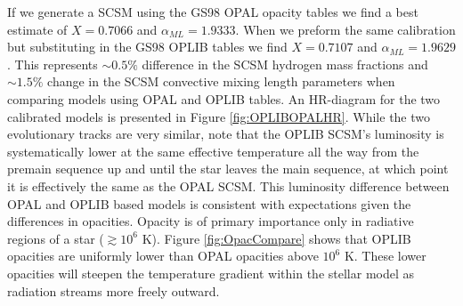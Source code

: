 If we generate a SCSM using the GS98 OPAL opacity tables we find a best
estimate of $X=0.7066$ and $\alpha_{ML} = 1.9333$. When we preform the same
calibration but substituting in the GS98 OPLIB tables we find $X=0.7107$ and
$\alpha_{ML} = 1.9629$. This represents $\sim 0.5\%$ difference in the SCSM
hydrogen mass fractions and $\sim 1.5\%$ change in the SCSM convective mixing
length parameters when comparing models using OPAL and OPLIB tables. An
HR-diagram for the two calibrated models is presented in Figure
\ref{fig:OPLIBOPALHR}. While the two evolutionary tracks are very similar, note
that the OPLIB SCSM's luminosity is systematically lower at the same effective
temperature all the way from the premain sequence up and until the star leaves
the main sequence, at which point it is effectively the same as the OPAL SCSM.
This luminosity difference between OPAL and OPLIB based models is consistent
with expectations given the differences in opacities. Opacity is of primary
importance only in radiative regions of a star ($\gtrsim 10^{6}$ K). Figure
\ref{fig:OpacCompare} shows that OPLIB opacities are uniformly lower than OPAL
opacities above $10^{6}$ K. These lower opacities will steepen the temperature
gradient within the stellar model as radiation streams more freely outward.
